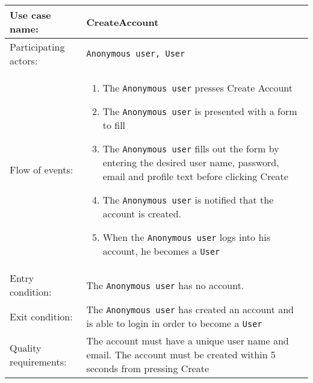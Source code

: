 \documentclass{article}
\begin{document}
\noindent
\begin{tabular}{| l | p{8cm} |}
  \hline                        
 Use case name:  & CreateAccount   \\   \hline                
 Participating actors:  & \texttt{Anonymous user, User} \\   \hline          
  Flow of events: & \begin{enumerate}
\item{The \texttt{Anonymous user} presses Create Account}
\item{The \texttt{Anonymous user} is presented with a form to fill}
\item{The \texttt{Anonymous user} fills out the form by entering the desired user name, password, email and profile text before clicking Create}
\item{The \texttt{Anonymous user} is notified that the account is created.}
\item{When the \texttt{Anonymous user} logs into his account, he becomes a \texttt{User}}
\end{enumerate}
 \\   \hline 
Entry condition: & The \texttt{Anonymous user} has no account. \\ \hline
Exit condition: & The \texttt{Anonymous user} has created an account and is able to login in order to become a \texttt{User} \\ \hline
Quality requirements: & The account must have a unique user name and email. The account must be created within 5 seconds from pressing Create \\ \hline             
\end{tabular} \\
\end{document}
